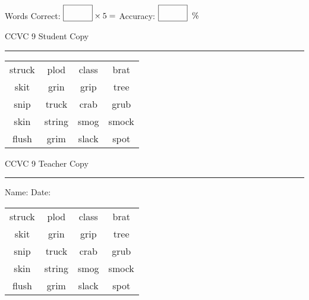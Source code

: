 \documentclass{memoir}
\begin{document}
\normalsize

Words Correct: $\fbox{\phantom{\huge 100}} \times 5 = $ Accuracy: $\fbox{\phantom{\huge 100}}\;\; \%$ 

\vfill

\newpage


\footnotesize \noindent
CCVC 9 \hfill Student Copy
\smallskip
\hrule

\Large

\setlength{\tabcolsep}{14pt}
\def\arraystretch{3}

{\selectfont


\begin{vplace}[0.5]
\begin{center}
\begin{tabular}{cccc}
struck & plod & class             & brat               \\
skit & grin     & grip      & tree \\
snip & truck & crab        & grub \\
skin & string & smog & smock \\
flush & grim       & slack            & spot \\
\end{tabular}
\end{center}
\end{vplace}

}

\newpage

\footnotesize \noindent
CCVC 9 \hfill Teacher Copy
\smallskip
\hrule

\normalsize

\vfill

\noindent
Name: \underline{\hspace{1.75in}} \hfill Date: \underline{\hspace{1in}}

\Large

{\selectfont


\begin{vplace}[0.5]
\begin{center}
\begin{tabular}{cccc}
struck & plod & class             & brat               \\
skit & grin     & grip      & tree \\
snip & truck & crab        & grub \\
skin & string & smog & smock \\
flush & grim       & slack            & spot \\
\end{tabular}
\end{center}
\end{vplace}



}
\end{document}
